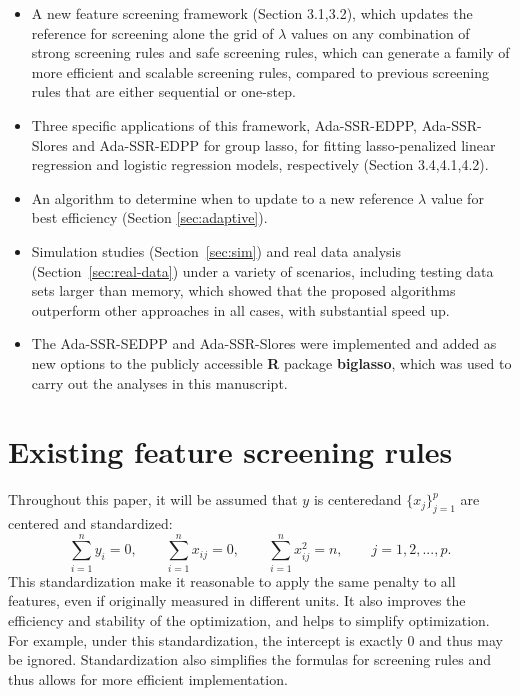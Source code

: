 \documentclass{article}
\begin{document}
\begin{itemize}
    \item A new feature screening framework (Section 3.1,3.2), which updates the reference for screening alone the grid of $\lambda$ values on any combination of strong screening rules and safe screening rules, which can generate a family of more efficient and scalable screening rules, compared to previous screening rules that are either sequential or one-step.
    \item Three specific applications of this framework, Ada-SSR-EDPP, Ada-SSR-Slores and Ada-SSR-EDPP for group lasso, for fitting lasso-penalized linear regression and logistic regression models, respectively (Section 3.4,4.1,4.2).
    \item An algorithm to determine when to update to a new reference $\lambda$ value for best efficiency (Section \ref{sec:adaptive}).
    \item Simulation studies (Section~\ref{sec:sim}) and real data analysis (Section~\ref{sec:real-data}) under a variety of scenarios, including testing data sets larger than memory, which showed that the proposed algorithms outperform other approaches in all cases, with substantial speed up.
    \item The Ada-SSR-SEDPP and Ada-SSR-Slores were implemented and added as new options to the publicly accessible \textbf{R} package \textbf{biglasso}\citep{zeng2017biglasso}, which was used to carry out the analyses in this manuscript.
\end{itemize}

\section{Existing feature screening rules}
\label{sec:existing}

Throughout this paper, it will be assumed that $y$ is centeredand $\{x_j\}_{j=1}^p$ are centered and standardized:
\begin{equation}
    \sum_{i=1}^ny_i=0, \qquad \sum_{i=1}^n x_{ij}=0, \qquad \sum_{i=1}^n x_{ij}^2=n,\qquad j=1,2,...,p.
\end{equation}
This standardization make it reasonable to apply the same penalty to all features, even if originally measured in different units. It also improves the efficiency and stability of the optimization, and helps to simplify optimization.  For example, under this standardization, the intercept is exactly 0 and thus may be ignored.  Standardization also simplifies the formulas for screening rules and thus allows for more efficient implementation.
\end{document}

